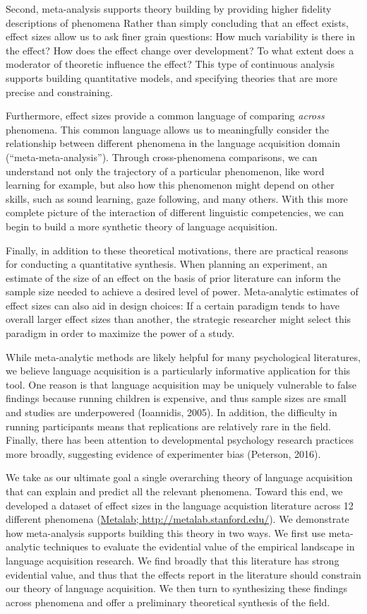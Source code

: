 \documentclass[english,floatsintext,man]{apa6}
\begin{document}
Second, meta-analysis supports theory building by providing higher
fidelity descriptions of phenomena Rather than simply concluding that an
effect exists, effect sizes allow us to ask finer grain questions: How
much variability is there in the effect? How does the effect change over
development? To what extent does a moderator of theoretic influence the
effect? This type of continuous analysis supports building quantitative
models, and specifying theories that are more precise and constraining.

Furthermore, effect sizes provide a common language of comparing
\emph{across} phenomena. This common language allows us to meaningfully
consider the relationship between different phenomena in the language
acquisition domain (\enquote{meta-meta-analysis}). Through
cross-phenomena comparisons, we can understand not only the trajectory
of a particular phenomenon, like word learning for example, but also how
this phenomenon might depend on other skills, such as sound learning,
gaze following, and many others. With this more complete picture of the
interaction of different linguistic competencies, we can begin to build
a more synthetic theory of language acquisition.

Finally, in addition to these theoretical motivations, there are
practical reasons for conducting a quantitative synthesis. When planning
an experiment, an estimate of the size of an effect on the basis of
prior literature can inform the sample size needed to achieve a desired
level of power. Meta-analytic estimates of effect sizes can also aid in
design choices: If a certain paradigm tends to have overall larger
effect sizes than another, the strategic researcher might select this
paradigm in order to maximize the power of a study.

While meta-analytic methods are likely helpful for many psychological
literatures, we believe language acquisition is a particularly
informative application for this tool. One reason is that language
acquisition may be uniquely vulnerable to false findings because running
children is expensive, and thus sample sizes are small and studies are
underpowered (Ioannidis, 2005). In addition, the difficulty in running
participants means that replications are relatively rare in the field.
Finally, there has been attention to developmental psychology research
practices more broadly, suggesting evidence of experimenter bias
(Peterson, 2016).

We take as our ultimate goal a single overarching theory of language
acquisition that can explain and predict all the relevant phenomena.
Toward this end, we developed a dataset of effect sizes in the language
acquistion literature across 12 different phenomena
(\href{http://metalab.stanford.edu}{Metalab;
http://metalab.stanford.edu/}). We demonstrate how meta-analysis
supports building this theory in two ways. We first use meta-analytic
techniques to evaluate the evidential value of the empirical landscape
in language acquisition research. We find broadly that this literature
has strong evidential value, and thus that the effects report in the
literature should constrain our theory of language acquisition. We then
turn to synthesizing these findings across phenomena and offer a
preliminary theoretical synthesis of the field.
\end{document}
